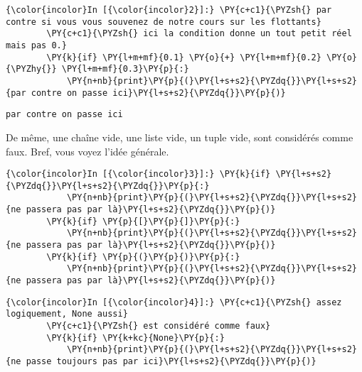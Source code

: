     \begin{Verbatim}[commandchars=\\\{\},frame=single,framerule=0.3mm,rulecolor=\color{cellframecolor}]
{\color{incolor}In [{\color{incolor}2}]:} \PY{c+c1}{\PYZsh{} par contre si vous vous souvenez de notre cours sur les flottants}
        \PY{c+c1}{\PYZsh{} ici la condition donne un tout petit réel mais pas 0.}
        \PY{k}{if} \PY{l+m+mf}{0.1} \PY{o}{+} \PY{l+m+mf}{0.2} \PY{o}{\PYZhy{}} \PY{l+m+mf}{0.3}\PY{p}{:}
            \PY{n+nb}{print}\PY{p}{(}\PY{l+s+s2}{\PYZdq{}}\PY{l+s+s2}{par contre on passe ici}\PY{l+s+s2}{\PYZdq{}}\PY{p}{)}
\end{Verbatim}


    \begin{Verbatim}[commandchars=\\\{\},frame=single,framerule=0.3mm,rulecolor=\color{cellframecolor}]
par contre on passe ici
\end{Verbatim}

    De même, une chaîne vide, une liste vide, un tuple vide, sont considérés
comme faux. Bref, vous voyez l'idée générale.

    \begin{Verbatim}[commandchars=\\\{\},frame=single,framerule=0.3mm,rulecolor=\color{cellframecolor}]
{\color{incolor}In [{\color{incolor}3}]:} \PY{k}{if} \PY{l+s+s2}{\PYZdq{}}\PY{l+s+s2}{\PYZdq{}}\PY{p}{:} 
            \PY{n+nb}{print}\PY{p}{(}\PY{l+s+s2}{\PYZdq{}}\PY{l+s+s2}{ne passera pas par là}\PY{l+s+s2}{\PYZdq{}}\PY{p}{)}
        \PY{k}{if} \PY{p}{[}\PY{p}{]}\PY{p}{:} 
            \PY{n+nb}{print}\PY{p}{(}\PY{l+s+s2}{\PYZdq{}}\PY{l+s+s2}{ne passera pas par là}\PY{l+s+s2}{\PYZdq{}}\PY{p}{)}
        \PY{k}{if} \PY{p}{(}\PY{p}{)}\PY{p}{:}
            \PY{n+nb}{print}\PY{p}{(}\PY{l+s+s2}{\PYZdq{}}\PY{l+s+s2}{ne passera pas par là}\PY{l+s+s2}{\PYZdq{}}\PY{p}{)}
\end{Verbatim}


    \begin{Verbatim}[commandchars=\\\{\},frame=single,framerule=0.3mm,rulecolor=\color{cellframecolor}]
{\color{incolor}In [{\color{incolor}4}]:} \PY{c+c1}{\PYZsh{} assez logiquement, None aussi}
        \PY{c+c1}{\PYZsh{} est considéré comme faux}
        \PY{k}{if} \PY{k+kc}{None}\PY{p}{:}
            \PY{n+nb}{print}\PY{p}{(}\PY{l+s+s2}{\PYZdq{}}\PY{l+s+s2}{ne passe toujours pas par ici}\PY{l+s+s2}{\PYZdq{}}\PY{p}{)}
\end{Verbatim}


